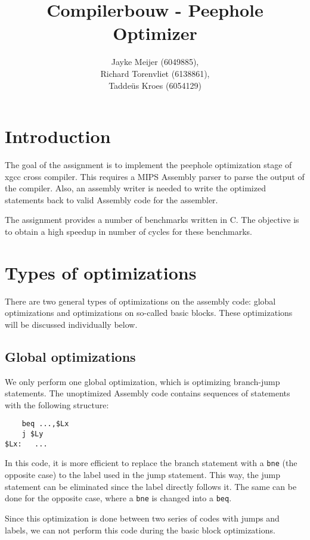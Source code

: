 \documentclass[10pt,a4paper]{article}
\title{Compilerbouw - Peephole Optimizer}
\author{Jayke Meijer (6049885), \\
        Richard Torenvliet (6138861), \\
        Tadde\"us Kroes (6054129)}
\begin{document}
\maketitle
\tableofcontents

\pagebreak

\section{Introduction}

The goal of the assignment is to implement the peephole optimization stage of
xgcc cross compiler. This requires a MIPS Assembly parser to parse the output
of the compiler. Also, an assembly writer is needed to write the optimized
statements back to valid Assembly code for the assembler.

The assignment provides a number of benchmarks written in C. The objective is
to obtain a high speedup in number of cycles for these benchmarks.

\section{Types of optimizations}

There are two general types of optimizations on the assembly code: global
optimizations and optimizations on so-called basic blocks. These optimizations
will be discussed individually below.

\subsection{Global optimizations}

We only perform one global optimization, which is optimizing branch-jump
statements. The unoptimized Assembly code contains sequences of statements with
the following structure:
\begin{verbatim}
    beq ...,$Lx
    j $Ly
$Lx:   ...
\end{verbatim}
In this code, it is more efficient to replace the branch statement with a
\texttt{bne} (the opposite case) to the label used in the jump statement. This
way, the jump statement can be eliminated since the label directly follows it.
The same can be done for the opposite case, where a \texttt{bne} is changed
into a \texttt{beq}.

Since this optimization is done between two series of codes with jumps and
labels, we can not perform this code during the basic block optimizations.
\end{document}

